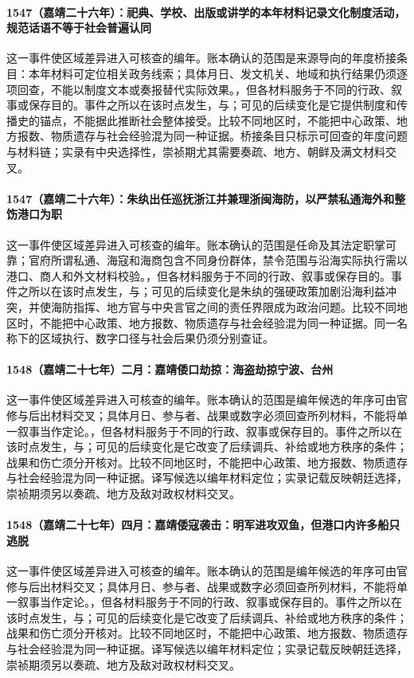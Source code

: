 \paragraph{1547（嘉靖二十六年）：祀典、学校、出版或讲学的本年材料记录文化制度活动，规范话语不等于社会普遍认同} 这一事件使区域差异进入可核查的编年。账本确认的范围是来源导向的年度桥接条目：本年材料可定位相关政务线索；具体月日、发文机关、地域和执行结果仍须逐项回查，不能以制度文本或奏报替代实际效果。，但各材料服务于不同的行政、叙事或保存目的。事件之所以在该时点发生，与；可见的后续变化是它提供制度和传播史的锚点，不能据此推断社会整体接受。比较不同地区时，不能把中心政策、地方报数、物质遗存与社会经验混为同一种证据。桥接条目只标示可回查的年度问题与材料链；实录有中央选择性，崇祯期尤其需要奏疏、地方、朝鲜及满文材料交叉。

\paragraph{1547（嘉靖二十六年）：朱纨出任巡抚浙江并兼理浙闽海防，以严禁私通海外和整饬港口为职} 这一事件使区域差异进入可核查的编年。账本确认的范围是任命及其法定职掌可靠；官府所谓私通、海寇和海商包含不同身份群体，禁令范围与沿海实际执行需以港口、商人和外文材料校验。，但各材料服务于不同的行政、叙事或保存目的。事件之所以在该时点发生，与；可见的后续变化是朱纨的强硬政策加剧沿海利益冲突，并使海防指挥、地方官与中央言官之间的责任界限成为政治问题。比较不同地区时，不能把中心政策、地方报数、物质遗存与社会经验混为同一种证据。同一名称下的区域执行、数字口径与社会后果仍须分别查证。

\paragraph{1548（嘉靖二十七年）二月：嘉靖倭口劫掠：海盗劫掠宁波、台州} 这一事件使区域差异进入可核查的编年。账本确认的范围是编年候选的年序可由官修与后出材料交叉；具体月日、参与者、战果或数字必须回查所列材料，不能将单一叙事当作定论。，但各材料服务于不同的行政、叙事或保存目的。事件之所以在该时点发生，与；可见的后续变化是它改变了后续调兵、补给或地方秩序的条件；战果和伤亡须分开核对。比较不同地区时，不能把中心政策、地方报数、物质遗存与社会经验混为同一种证据。译写候选以编年材料定位；实录记载反映朝廷选择，崇祯期须另以奏疏、地方及敌对政权材料交叉。

\paragraph{1548（嘉靖二十七年）四月：嘉靖倭寇袭击：明军进攻双鱼，但港口内许多船只逃脱} 这一事件使区域差异进入可核查的编年。账本确认的范围是编年候选的年序可由官修与后出材料交叉；具体月日、参与者、战果或数字必须回查所列材料，不能将单一叙事当作定论。，但各材料服务于不同的行政、叙事或保存目的。事件之所以在该时点发生，与；可见的后续变化是它改变了后续调兵、补给或地方秩序的条件；战果和伤亡须分开核对。比较不同地区时，不能把中心政策、地方报数、物质遗存与社会经验混为同一种证据。译写候选以编年材料定位；实录记载反映朝廷选择，崇祯期须另以奏疏、地方及敌对政权材料交叉。
